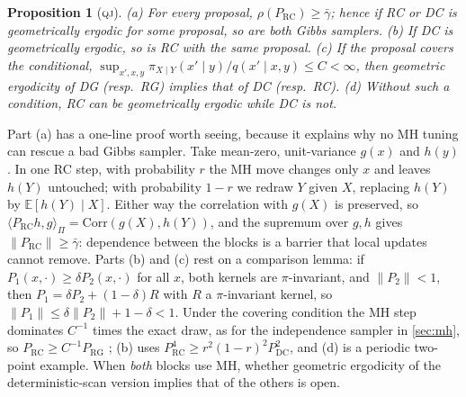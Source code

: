 \documentclass[11pt]{article}
\newtheorem{proposition}{Proposition}
\theoremstyle{remark}
\newcommand{\QJ}{\textsc{qj}}
\newcommand{\E}{\mathbb{E}}
\newcommand{\RG}{\mathrm{RG}}
\newcommand{\RC}{\mathrm{RC}}
\newcommand{\DC}{\mathrm{DC}}
\begin{document}
\begin{proposition}[\QJ]\label{prop:qjmap}
(a) For every proposal, $\rho(P_\RC)\ge\bar\gamma$; hence if RC or DC is geometrically ergodic for some proposal, so are both Gibbs samplers. (b) If DC is geometrically ergodic, so is RC with the same proposal. (c) If the proposal covers the conditional, $\sup_{x',x,y}\pi_{X\mid Y}(x'\mid y)/q(x'\mid x,y)\le C<\infty$, then geometric ergodicity of DG (resp.\ RG) implies that of DC (resp.\ RC). (d) Without such a condition, RC can be geometrically ergodic while DC is not.
\end{proposition}

Part (a) has a one-line proof worth seeing, because it explains why no MH tuning can rescue a bad Gibbs sampler. Take mean-zero, unit-variance $g(x)$ and $h(y)$. In one RC step, with probability $r$ the MH move changes only $x$ and leaves $h(Y)$ untouched; with probability $1-r$ we redraw $Y$ given $X$, replacing $h(Y)$ by $\E[h(Y)\mid X]$. Either way the correlation with $g(X)$ is preserved, so $\langle P_\RC h,g\rangle_\Pi=\mathrm{Corr}(g(X),h(Y))$, and the supremum over $g,h$ gives $\|P_\RC\|\ge\bar\gamma$: dependence between the blocks is a barrier that local updates cannot remove. Parts (b) and (c) rest on a comparison lemma: if $P_1(x,\cdot)\ge\delta P_2(x,\cdot)$ for all $x$, both kernels are $\pi$-invariant, and $\|P_2\|<1$, then $P_1=\delta P_2+(1-\delta)R$ with $R$ a $\pi$-invariant kernel, so $\|P_1\|\le\delta\|P_2\|+1-\delta<1$. Under the covering condition the MH step dominates $C^{-1}$ times the exact draw, as for the independence sampler in \cref{sec:mh}, so $P_\RC\ge C^{-1}P_\RG$ \citep{jones2014conditional}; (b) uses $P_\RC^4\ge r^2(1-r)^2P_\DC^2$, and (d) is a periodic two-point example. When \emph{both} blocks use MH, whether geometric ergodicity of the deterministic-scan version implies that of the others is open.
\end{document}
